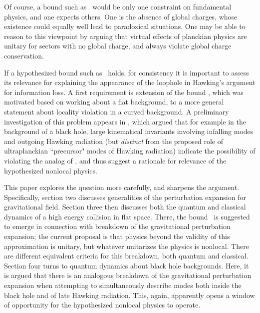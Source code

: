 Of course, a bound such as \gravbd\ would be only one constraint on fundamental physics,  and one expects others.  One is the absence of global charges, whose existence could equally well lead to paradoxical situations. One may be able to reason to this viewpoint by arguing that virtual effects of planckian physics are unitary for sectors with no global charge, and always violate global charge conservation.

If a hypothesized bound such as \gravbd\ holds, for consistency it is important to assess its relevance for explaining the appearance of the loophole in Hawking's argument for information loss.   A first requirement is extension of the bound \gravbd, which was motivated based on working about a flat background, to a more general statement about locality violation in a curved background.   A preliminary investigation of this problem appears in , which argued that for example in the background of a black hole, large kinematical invariants involving infalling modes and outgoing Hawking radiation (but {\it distinct} from the proposed role of ultraplanckian ``precursor" modes of Hawking radiation) indicate the possibility of violating the analog of \gravbd, and thus suggest a rationale for relevance of the hypothesized nonlocal physics.   

This paper explores the question more carefully, and sharpens the argument.  Specifically, section two discusses generalities of the perturbation expansion for gravitational field.  Section three then discusses both the quantum and classical dynamics of a high energy collision in flat space.  There, the bound \gravbd\ is suggested to emerge in connection with breakdown of the gravitational perturbation expansion; the current proposal is that physics beyond the validity of this  approximation is unitary, but whatever unitarizes the physics is nonlocal.  There are different equivalent criteria for this breakdown, both quantum and classical.  Section four turns to quantum dynamics about black hole backgrounds.  Here, it is argued that there is an analogous breakdown of the gravitational perturbation expansion when attempting to simultaneously describe modes both inside the black hole and of late Hawking radiation.  This, again, apparently opens a window of opportunity for the hypothesized nonlocal physics to operate. 




